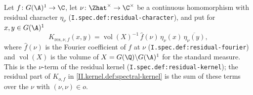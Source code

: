 Let $f\colon G(\A)^1\to\C$, let $\nu\colon\Zhat^\times\to\C^\times$ be a continuous homomorphism with residual character $\eta_\nu$ (\texttt{I.spec.def:residual-character}), and put for $x,y\in G(\A)^1$
\[
  K_{\mathrm{res},\nu,f}(x,y)=\operatorname{vol}(X)^{-1}\,\hat f(\nu)\,\eta_\nu(x)\,\overline{\eta_\nu(y)},
\]
where $\hat f(\nu)$ is the Fourier coefficient of $f$ at $\nu$ (\texttt{I.spec.def:residual-fourier}) and $\operatorname{vol}(X)$ is the volume of $X=G(\Q)\backslash G(\A)^1$ for the standard measure. This is the $\nu$-term of the residual kernel (\texttt{I.spec.def:residual-kernel}); the residual part of $K_{o,f}$ in \cref{II.kernel.def:spectral-kernel} is the sum of these terms over the $\nu$ with $(\nu,\nu)\in o$.
